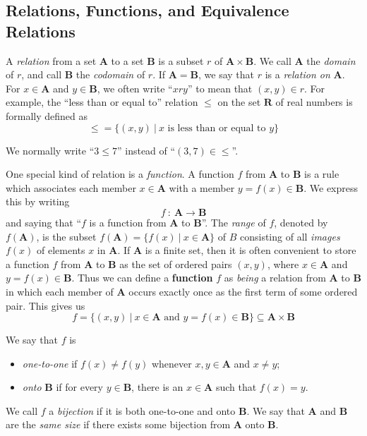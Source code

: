 \documentclass{article}
\newcommand{\A}{\mathbf A}
\newcommand{\B}{\mathbf B}
\newcommand{\R}{\mathbf R}
\begin{document}
\subsection{Relations, Functions, and Equivalence Relations} %


A \emph{relation} from a set $\A$ to a set $\B$ is a subset $r$ of $\A \times \B$. We call $\A$ the \emph{domain} of $r$, and call $\B$ the \emph{codomain} of $r$. If $\A = \B$, we say that $r$ is a \emph{relation on} $\A$. For $x \in \A$ and $y \in \B$, we often write ``$xry$'' to mean that $(x,y) \in r$. For example, the ``less than or equal to'' relation $\leq$ on the set $\R$ of real numbers is formally defined as
\begin{equation*}
\leq = \{ (x,y)\ |\ x \text{ is less than or equal to } y \}
\end{equation*}

We normally write ``$3 \leq 7$'' instead of ``$(3,7) \in \leq$''.

One special kind of relation is a \emph{function}. A function $f$ from $\A$ to $\B$ is a rule which associates each member $x \in \A$ with a member $y = f(x) \in \B$. We express this by writing
\begin{equation*}
f\ :\ \A \to \B
\end{equation*}
and saying that ``$f$ is a function from $\A$ to $\B$''. The \emph{range} of $f$, denoted by $f(\A)$, is the subset $f(\A) = \{ f(x)\ |\ x \in \A \}$ of $B$ consisting of all \emph{images} $f(x)$ of elements $x$ in $\A$. If $\A$ is a finite set, then it is often convenient to store a function $f$ from $\A$ to $\B$ as the set of ordered pairs $(x,y)$, where $x \in \A$ and $y = f(x) \in \B$.  Thus we can define a \textbf{function} $f$ as \emph{being} a relation from $\A$ to $\B$ in which each member of $\A$ occurs exactly once as the first term of some ordered pair. This gives us
\begin{equation*}
f = \{ (x,y)\ |\ x \in \A \text{ and } y = f(x) \in \B \} \subseteq \A \times \B
\end{equation*}

We say that $f$ is
\begin{itemize}
  \item \emph{one-to-one} if $f(x) \neq f(y)$ whenever $x,y \in \A$ and $x \neq y$;
  \item \emph{onto} $\B$ if for every $y \in \B$, there is an $x \in \A$ such that $f(x) = y$.
\end{itemize}

We call $f$ a \emph{bijection} if it is both one-to-one and onto $\B$. We say that $\A$ and $\B$ are the \emph{same size} if there exists some bijection from $\A$ onto $\B$.
\end{document}
